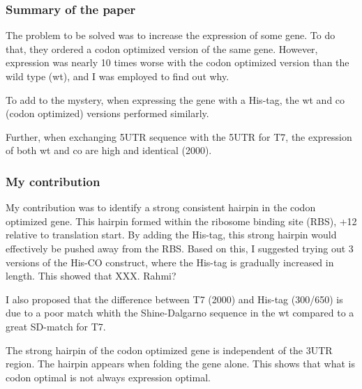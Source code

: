%

\subsubsection{Summary of the paper}
The problem to be solved was to increase the expression of some gene. To do
that, they ordered a codon optimized version of the same gene. However,
expression was nearly 10 times worse with the codon optimized version than the
wild type (wt), and I was employed to find out why.

To add to the mystery, when expressing the gene with a His-tag, the wt and co
(codon optimized) versions performed similarly.

Further, when exchanging 5UTR sequence with the 5UTR for T7, the expression of
both wt and co are high and identical (2000).

\subsubsection{My contribution}

My contribution was to identify a strong consistent hairpin in the codon
optimized gene. This hairpin formed within the ribosome binding site (RBS), +12
relative to translation start. By adding the His-tag, this strong hairpin would
effectively be pushed away from the RBS. Based on this, I suggested trying out
3 versions of the His-CO construct, where the His-tag is gradually increased in
length. This showed that XXX. Rahmi?

I also proposed that the difference between T7 (2000) and His-tag (300/650) is
due to a poor match whith the Shine-Dalgarno sequence in the wt compared to a
great SD-match for T7.

The strong hairpin of the codon optimized gene is independent of the 3UTR
region. The hairpin appears when folding the gene alone. This shows that what
is codon optimal is not always expression optimal.
